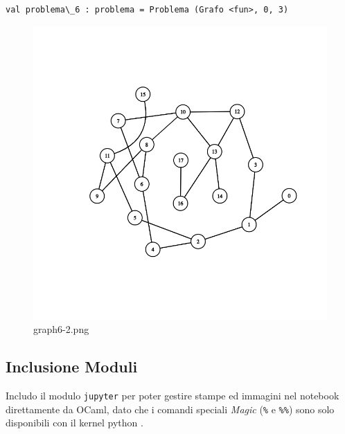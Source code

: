 \documentclass[11pt]{article}
\makeatletter
\newcommand{\boxspacing}{\kern\kvtcb@left@rule\kern\kvtcb@boxsep}
\newcommand{\prompt}[4]{
        {\ttfamily\llap{{\color{#2}[#3]:\hspace{3pt}#4}}\vspace{-\baselineskip}}
    }
\makeatother
\begin{document}
            \begin{tcolorbox}[breakable, size=fbox, boxrule=.5pt, pad at break*=1mm, opacityfill=0]
\prompt{Out}{outcolor}{9}{\boxspacing}
\begin{Verbatim}[commandchars=\\\{\}]
val problema\_6 : problema = Problema (Grafo <fun>, 0, 3)
\end{Verbatim}
\end{tcolorbox}
        
    \begin{figure}
\centering
\includegraphics[width=15cm, keepaspectratio]{Colored Camel_files/graph6-2.png}
\caption{graph6-2.png}
\end{figure}

    \hypertarget{inclusione-moduli}{%
\subsection{\texorpdfstring{Inclusione Moduli
}{Inclusione Moduli }}\label{inclusione-moduli}}

    Includo il modulo \texttt{jupyter} per poter gestire stampe ed immagini
nel notebook direttamente da OCaml, dato che i comandi speciali
\emph{Magic} (\texttt{\%} e \texttt{\%\%}) sono solo disponibili con il
kernel python .
\end{document}
